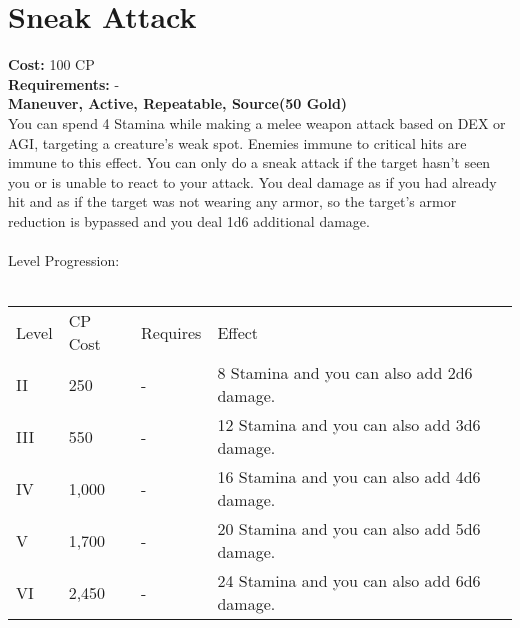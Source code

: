 \section{Sneak Attack}\label{maneuver:sneakAttack}
\textbf{Cost:} 100 CP\\
\textbf{Requirements:} -\\
\textbf{Maneuver, Active, Repeatable, Source(50 Gold)}\\
You can spend 4 Stamina while making a melee weapon attack based on DEX or AGI, targeting a creature's weak spot.
Enemies immune to critical hits are immune to this effect.
You can only do a sneak attack if the target hasn't seen you or is unable to react to your attack.
You deal damage as if you had already hit and as if the target was not wearing any armor, so the target's armor reduction is bypassed and you deal 1d6 additional damage.\\
\\
Level Progression:\\
\\
\begin{tabular}{l | l | l | l}
	Level & CP Cost & Requires & Effect\\
	II & 250 & - & 8 Stamina and you can also add 2d6 damage.\\
	III & 550 & - &  12 Stamina and you can also add 3d6 damage.\\
	IV & 1,000 & - &  16 Stamina and you can also add 4d6 damage.\\
	V & 1,700 & - &  20 Stamina and you can also add 5d6 damage.\\
	VI & 2,450 & - &  24 Stamina and you can also add 6d6 damage.\\
\end{tabular}